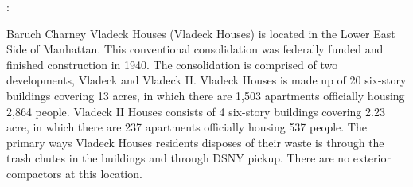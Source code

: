 :

Baruch Charney Vladeck Houses (Vladeck Houses) is located in the Lower East Side of Manhattan. This conventional consolidation was federally funded and finished construction in 1940. The consolidation is comprised of two developments, Vladeck and Vladeck II. Vladeck Houses is made up of 20 six-story buildings covering 13 acres, in which there are 1,503 apartments officially housing 2,864 people. Vladeck II Houses consists of 4 six-story buildings covering 2.23 acre, in which there are 237 apartments officially housing 537 people. The primary ways Vladeck Houses residents disposes of their waste is through the trash chutes in the buildings and through DSNY pickup. There are no exterior compactors at this location. 